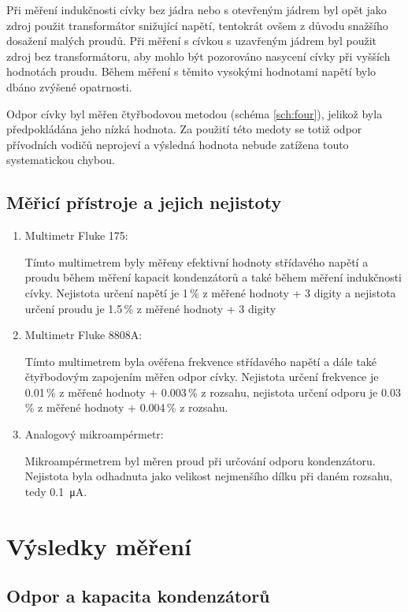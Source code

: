 \documentclass{../concepts/prepareprotokol} %
\begin{document}
Při měření indukčnosti cívky bez jádra nebo s otevřeným jádrem byl opět jako zdroj použit transformátor snižující napětí, tentokrát ovšem z důvodu snažšího dosažení malých proudů. Při měření s cívkou s uzavřeným jádrem byl použit zdroj bez transformátoru, aby mohlo být pozorováno nasycení cívky při vyšších hodnotách proudu. Během měření s těmito vysokými hodnotami napětí bylo dbáno zvýšené opatrnosti.

Odpor cívky byl měřen čtyřbodovou metodou (schéma \ref{sch:four}), jelikož byla předpokládána jeho nízká hodnota. Za použití této medoty se totiž odpor přívodních vodičů neprojeví a výsledná hodnota nebude zatížena touto systematickou chybou.

\subsection{Měřicí přístroje a jejich nejistoty}
\begin{enumerate}
    \item Multimetr Fluke 175:
    
    Tímto multimetrem byly měřeny efektivní hodnoty střídavého napětí a proudu během měření kapacit kondenzátorů a také během měření indukčnosti cívky. Nejistota určení napětí je 1\,\% z měřené hodnoty + 3 digity a nejistota určení proudu je 1.5\,\% z měřené hodnoty + 3 digity

    \item Multimetr Fluke 8808A:

    Tímto multimetrem byla ověřena frekvence střídavého napětí a dále také čtyřbodovým zapojením měřen odpor cívky. Nejistota určení frekvence je 0.01\,\% z měřené hodnoty + 0.003\,\% z rozsahu, nejistota určení odporu je 0.03\,\% z měřené hodnoty + 0.004\,\% z rozsahu.

    \item Analogový mikroampérmetr:

    Mikroampérmetrem byl měren proud při určování odporu kondenzátoru. Nejistota byla odhadnuta jako velikost nejmenšího dílku při daném rozsahu, tedy \qty{0.1}{\micro\ampere}.

\end{enumerate}


\section{Výsledky měření}

\subsection{Odpor a kapacita kondenzátorů}
\end{document}
